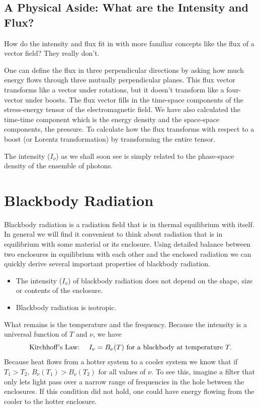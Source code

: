 \subsection[A Physical Aside: Intensity and Flux]{A Physical Aside: What are the Intensity and Flux?}
\label{sec:physical-aside:-what}

How do the intensity and flux fit in with more familiar concepts like 
the flux of a vector field?   They really don't.   

One can define the flux in three perpendicular directions by asking
how much energy flows through three mutually perpendicular planes.
This flux vector transforms like a vector under rotations, but it
doesn't transform like a four-vector under boosts.  The flux vector
fills in the time-space components of the stress-energy tensor of the
electromagnetic field.  We have also calculated the time-time component which
is the energy density and the space-space components, the pressure.
To calculate how the flux transforms with respect to a boost (or
Lorentz transformation) by transforming the entire tensor.

The intensity ($I_\nu$) as we shall soon see is simply related to the
phase-space density of the ensemble of photons.

\section{Blackbody Radiation}
\label{sec:blackbody-radiation}
Blackbody radiation is a radiation field that is in thermal
equilibrium with itself.  In general we will find it convenient to
think about radiation that is in equilibrium with some material or its
enclosure.  Using detailed balance between two enclosures in
equilibrium with each other and the enclosed radiation we can quickly
derive several important properties of blackbody radiation.
\begin{itemize}
\item The intensity ($I_\nu$) of blackbody radiation does not depend on the
shape, size or contents of the enclosure.
\item Blackbody radiation is isotropic.
\end{itemize}
What remains is the temperature and the frequency.   Because the
intensity is a universal function of $T$ and $\nu$, we have
\begin{equation}
\hbox{\rm Kirchhoff's Law:}~~~~I_\nu = B_\nu (T)  \hbox{\rm ~for a blackbody at temperature~} T.
\label{eq:20}
\end{equation}
Because heat flows from a hotter system to a cooler system we know 
that if $T_1 > T_2$, $B_\nu (T_1)>B_\nu(T_2)$ for all values of $\nu$.
To see this, imagine a filter that only lets light pass over a narrow
range of frequencies in the hole between the enclosures.  If this
condition did not hold, one could have energy flowing from the cooler
to the hotter enclosure.

